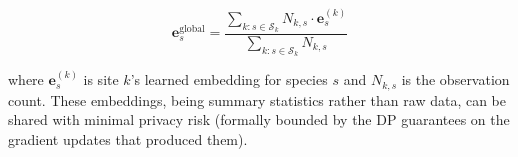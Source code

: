 \begin{equation}
    \mathbf{e}_s^{\text{global}} = \frac{\sum_{k: s \in \mathcal{S}_k} N_{k,s} \cdot \mathbf{e}_s^{(k)}}{\sum_{k: s \in \mathcal{S}_k} N_{k,s}}
\end{equation}

\noindent where $\mathbf{e}_s^{(k)}$ is site $k$'s learned embedding for species $s$ and $N_{k,s}$ is the observation count.
These embeddings, being summary statistics rather than raw data, can be shared with minimal privacy risk (formally bounded by the DP guarantees on the gradient updates that produced them).


